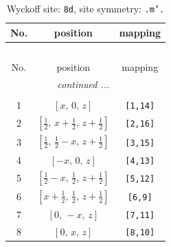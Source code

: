 \documentclass[fleqn,8pt]{jsarticle}
\begin{document}
\begin{longtable}{ccc}
\caption{Wyckoff site: {\tt 8d}, site symmetry: {\tt .m'.}}
 \\
 \hline \hline
No. & position & mapping \\ \hline \endfirsthead

\multicolumn{2}{l}{\tablename\ \thetable{}} \\
 \hline \hline
No. & position & mapping \\ \hline \endhead

 \hline \hline
\multicolumn{2}{r}{\footnotesize\it continued ...} \\ \endfoot

 \hline \hline
\multicolumn{2}{r}{} \\ \endlastfoot

1 & $\left[ x,\, 0,\, z \right]$ & {\tt [1,14]} \\ \hline
2 & $\left[ \frac{1}{2},\, x + \frac{1}{2},\, z + \frac{1}{2} \right]$ & {\tt [2,16]} \\ \hline
3 & $\left[ \frac{1}{2},\, \frac{1}{2} - x,\, z + \frac{1}{2} \right]$ & {\tt [3,15]} \\ \hline
4 & $\left[ - x,\, 0,\, z \right]$ & {\tt [4,13]} \\ \hline
5 & $\left[ \frac{1}{2} - x,\, \frac{1}{2},\, z + \frac{1}{2} \right]$ & {\tt [5,12]} \\ \hline
6 & $\left[ x + \frac{1}{2},\, \frac{1}{2},\, z + \frac{1}{2} \right]$ & {\tt [6,9]} \\ \hline
7 & $\left[ 0,\, - x,\, z \right]$ & {\tt [7,11]} \\ \hline
8 & $\left[ 0,\, x,\, z \right]$ & {\tt [8,10]} \\
\end{longtable}
\renewcommand{\arraystretch}{1.2}
\end{document}
